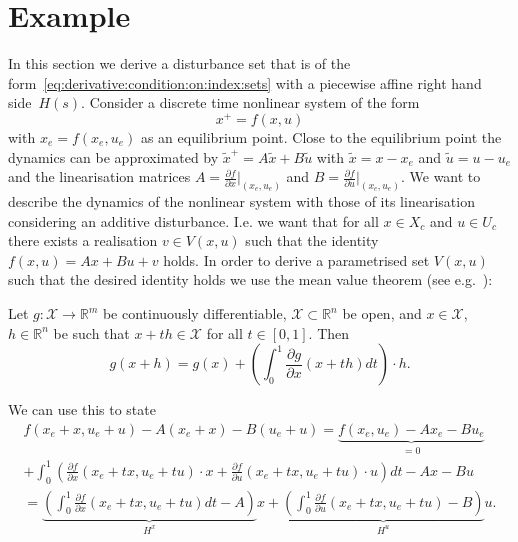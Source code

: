 \section{Example}\label{sec:example:linearisation:error:as:state:dependent:constraint}
In this section we derive a disturbance set that is of the form~\eqref{eq:derivative:condition:on:index:sets}
with a piecewise affine right hand side~$H(s)$. 
%
Consider a discrete time nonlinear system of the form
%
\begin{equation}
	x^+ = f(x,u)
\end{equation}
%
with $x_e=f(x_e,u_e)$ as an equilibrium point. 
%
Close to the equilibrium point the dynamics can be approximated by ${\tilde x}^+ = A \tilde x 
+ B\tilde u$ with $\tilde x = x-x_e$ and $\tilde u = u - u_e$ and the linearisation matrices
$A = \frac{\partial f}{\partial x}\vert_{(x_e,u_e)}$ and $B = \frac{\partial f}{\partial u}
\vert_{(x_e,u_e)}$.
%
We want to describe the dynamics of the nonlinear system with those of its linearisation considering
an additive disturbance. 
%
I.e. we want that for all $x\in X_c$ and $u\in U_c$ there exists a realisation 
$v\in V(x,u)$ such that the identity $f(x,u)=Ax + B u + v$ holds. 
%
In order to derive a parametrised set $V(x,u)$ such that the desired identity holds we use
the mean value theorem (see e.g.~\cite{Apostol:1974}):
%
\begin{thm}\label{thm:mean:value:theorem}
Let $g : \mathcal X \rightarrow\mathbb R^m$ be continuously
differentiable, $\mathcal X\subset\mathbb R^n$ be open,
and $x \in\mathcal X$, $h \in\mathbb R^n$ be such that 
$x + th \in\mathcal X$ for all $t\in [0 ,1]$. Then
\begin{equation}
	g(x+h) = g(x) + \left(\int_0^1 \frac{\partial g}{\partial x}(x+th)dt\right)\cdot h.
\end{equation}
\end{thm}
%
We can use this to state
%
\begin{equation}
\begin{split}
	f(x_e+x,u_e+u)-A(x_e+x)-B(u_e+u) = \underbrace{f(x_e,u_e) - A x_e - B u_e}_{=0} \\
	+ \int_0^1\left(\frac{\partial f}{\partial x}(x_e+tx,u_e+tu) \cdot x + 
	\frac{\partial f}{\partial u}(x_e+tx,u_e+tu) \cdot u \right) dt -Ax-Bu\\
	= \underbrace{\left(\int_0^1 \frac{\partial f}{\partial x}(x_e+tx,u_e+tu) dt - A\right)}_{H^x} x + 
	\underbrace{\left(\int_0^1 \frac{\partial f}{\partial u}(x_e+tx,u_e+tu) - B \right)}_{H^u} u.
\end{split}
\end{equation}

